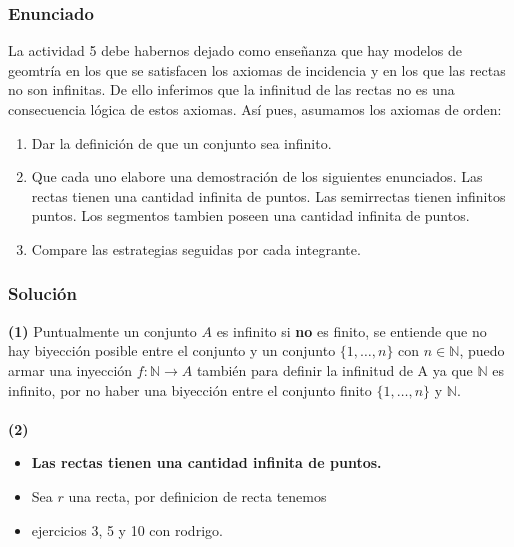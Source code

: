 \documentclass[a4paper]{article}
\begin{document}
\subsubsection{Enunciado}
La actividad 5 debe habernos dejado como enseñanza que hay modelos de geomtría en los que se satisfacen los axiomas de incidencia y en los que las rectas no son infinitas. De ello inferimos que la infinitud de las rectas no es una consecuencia lógica de estos axiomas. Así pues, asumamos los axiomas de orden:
\begin{enumerate}
    \item Dar la definición de que un conjunto sea infinito.
    \item Que cada uno elabore una demostración de los siguientes enunciados. Las rectas tienen una cantidad infinita de puntos. Las semirrectas tienen infinitos puntos. Los segmentos tambien poseen una cantidad infinita de puntos.
    \item Compare las estrategias seguidas por cada integrante.
\end{enumerate}
\subsubsection{Solución}
\textbf{(1)} Puntualmente un conjunto $A$ es infinito si \textbf{no} es finito, se entiende que no hay biyección posible entre el conjunto y un conjunto $\{1,\dots,n\}$ con $n\in \mathbb{N}$, puedo armar una inyección $f:\mathbb{N}\rightarrow A$ también para definir la infinitud de A ya que $\mathbb{N}$ es infinito, por no haber una biyección entre el conjunto finito $\{1,\dots, n\}$ y $\mathbb{N}$.\\\\
\textbf{(2)}
\begin{itemize}
    \item \textbf{Las rectas tienen una cantidad infinita de puntos.}\\
    \item Sea $r$ una recta,  por definicion de recta tenemos 
    \item ejercicios 3, 5 y 10 con rodrigo.
\end{itemize}
\end{document}
